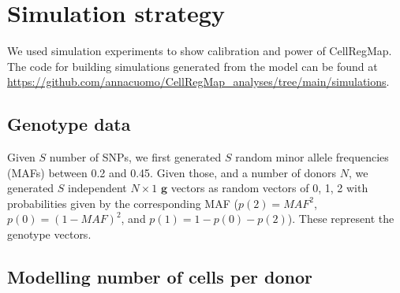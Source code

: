 



\section{Simulation strategy}\label{sec:simulations}

We used simulation experiments to show calibration and power of CellRegMap.
The code for building simulations generated from the model can be found at \url{https://github.com/annacuomo/CellRegMap_analyses/tree/main/simulations}.

\subsection{Genotype data}

Given $S$ number of SNPs, we first generated $S$ random minor allele frequencies (MAFs) between 0.2 and 0.45.
Given those, and a number of donors $N$, we generated $S$ independent $N \times 1$ $\mathbf{g}$ vectors as random vectors of 0, 1, 2 with probabilities given by the corresponding MAF ($p(2) = MAF^2$, $p(0) = (1-MAF)^2$, and $p(1) = 1 - p(0) - p(2)$). 
These represent the genotype vectors.


\subsection{Modelling number of cells per donor}\label{sec:cells_per_donor}

